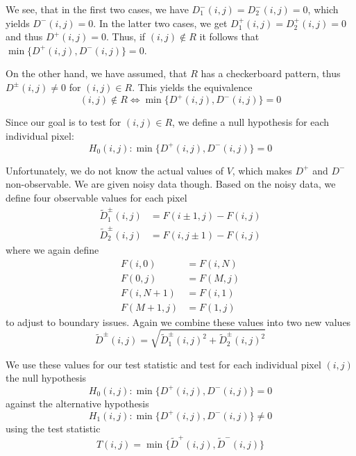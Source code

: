\documentclass[a4paper,12pt]{article}
\theoremstyle{plain}
\theoremstyle{definition}
\theoremstyle{remark}
\begin{document}
We see, that in the first two cases, we have $D^-_1(i, j) = D^-_2(i, j) = 0$, which yields $D^-(i, j) = 0$. In the latter two cases, we get $D^+_1(i, j) = D^+_2(i, j) = 0$ and thus $D^+(i, j) = 0$. Thus, if $(i, j) \notin R$ it follows that $\min \{ D^+(i, j), D^-(i, j) \} = 0$.

On the other hand, we have assumed, that $R$ has a checkerboard pattern, thus $D^\pm(i, j) \neq 0$ for $(i, j) \in R$. This yields the equivalence
\begin{equation*}
	(i, j) \notin R \Leftrightarrow \min \{ D^+(i, j), D^-(i, j) \} = 0
\end{equation*}

Since our goal is to test for $(i, j) \in R$, we define a null hypothesis for each individual pixel:
\begin{equation}
	H_0(i, j): \min \{ D^+(i, j), D^-(i, j) \} = 0
\end{equation}

Unfortunately, we do not know the actual values of $V$, which makes $D^+$ and $D^-$ non-observable. We are given noisy data though. Based on the noisy data, we define four observable values for each pixel
\begin{align}
	\tilde{D}^\pm_1(i, j) &= F(i \pm 1, j) - F(i, j) \label{D1tilde} \\
	\tilde{D}^\pm_2(i, j) &= F(i, j \pm 1) - F(i, j) \label{D2tilde}
\end{align}
where we again define
\begin{align*}
	F(i, 0) &= F(i, N) \\
	F(0, j) &= F(M, j) \\
	F(i, N+1) &= F(i, 1) \\
	F(M+1, j) &= F(1, j)
\end{align*}
to adjust to boundary issues. Again we combine these values into two new values
\begin{equation}\label{Dtilde}
	\tilde{D}^\pm(i, j) = \sqrt{\tilde{D}_1^\pm(i, j)^2 + \tilde{D}_2^\pm(i, j)^2}
\end{equation}

We use these values for our test statistic and test for each individual pixel $(i, j)$ the null hypothesis
\begin{equation}
	H_0(i, j): \min \{ D^+(i, j), D^-(i, j) \} = 0
\end{equation}
against the alternative hypothesis
\begin{equation}
	H_1(i, j): \min \{ D^+(i, j), D^-(i, j) \} \neq 0
\end{equation}
using the test statistic
\begin{equation}
	T(i, j) = \min \{ \tilde{D}^+(i, j), \tilde{D}^-(i, j) \}
\end{equation}
\end{document}
